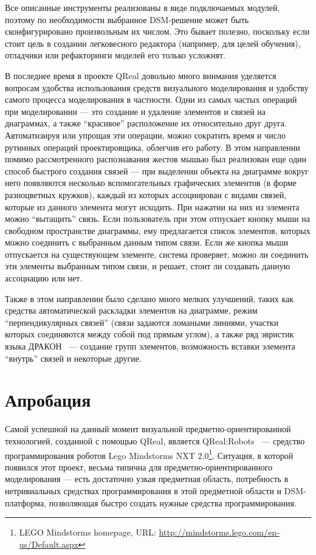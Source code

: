\documentclass[a4, 12pt]{article}
\begin{document}
Все описанные инструменты реализованы в виде подключаемых модулей, поэтому по необходимости выбранное DSM-решение может быть сконфигурировано произвольным их числом. Это бывает полезно, поскольку если стоит цель в создании легковесного редактора (например, для целей обучения), отладчики или рефакторинги моделей его только усложнят.

В последнее время в проекте QReal довольно много внимания уделяется вопросам удобства использования средств визуального моделирования и удобству самого процесса моделирования в частности. Одни из самых частых операций при моделировании --- это создание и удаление элементов и связей на диаграммах, а также ``красивое'' расположение их относительно друг друга. Автоматизируя или упрощая эти операции, можно сократить время и число рутинных операций проектировщика, облегчив его работу. В этом направлении помимо рассмотренного распознавания жестов мышью был реализован еще один способ быстрого создания связей --- при выделении объекта на диаграмме вокруг него появляются несколько вспомогательных графических элементов (в форме разноцветных кружков), каждый из которых ассоциирован с видами связей, которые из данного элемента могут исходить. При нажатии на них из элемента можно ``вытащить'' связь. Если пользователь при этом отпускает кнопку мыши на свободном пространстве диаграммы, ему предлагается список элементов, 
которых можно соединить с выбранным данным типом связи. Если же кнопка мыши отпускается на существующем элементе, система проверяет, можно ли соединить эти элементы выбранным типом связи, и решает, стоит ли создавать данную ассоциацию или нет. 

Также в этом направлении было сделано много мелких улучшений, таких как средства автоматической раскладки элементов на диаграмме, режим ``перпендикулярных связей'' (связи задаются ломаными линиями, участки которых соединяются между собой под прямым углом), а также ряд эвристик языка ДРАКОН~\cite{dragon} --- создание групп элементов, возможность вставки элемента ``внутрь'' связей и некоторые другие.

\section{Апробация}

Самой успешной на данный момент визуальной предметно-ориентированной технологией, созданной с помощью QReal, является QReal:Robots~\cite{qrealrobots} --- средство программирования роботов Lego Mindstorms NXT 2.0\footnote{LEGO Mindstorms homepage, URL: \url{http://mindstorms.lego.com/en-us/Default.aspx}}. Ситуация, в которой появился этот проект, весьма типична для предметно-ориентированного моделирования --- есть достаточно узкая предметная область, потребность в нетривиальных средствах программирования в этой предметной области и DSM-платформа, позволяющая быстро создать нужные средства программирования.
\end{document}
